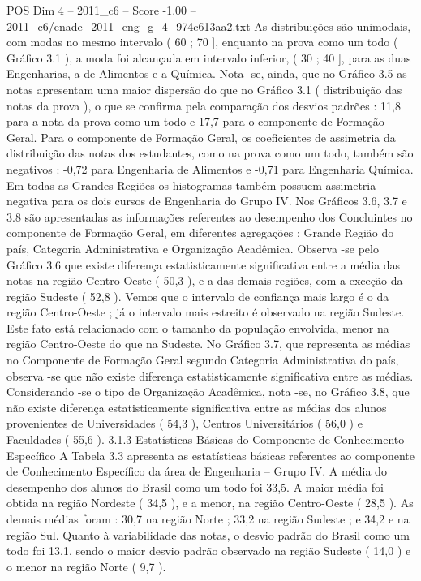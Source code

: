 \begin{textsample}{POS Dim 4 – 2011\_c6 – Score -1.00 – 2011\_c6/enade\_2011\_eng\_g\_4\_974c613aa2.txt}
As distribuições são unimodais, com modas no mesmo intervalo ( 60 ; 70 ], enquanto na prova como um todo ( Gráfico 3.1 ), a moda foi alcançada em intervalo inferior, ( 30 ; 40 ], para as duas Engenharias, a de Alimentos e a Química.
Nota -se, ainda, que no Gráfico 3.5 as notas apresentam uma maior dispersão do que no Gráfico 3.1 ( distribuição das notas da prova ), o que se confirma pela comparação dos desvios padrões : 11,8 para a nota da prova como um todo e 17,7 para o componente de Formação Geral.
Para o componente de Formação Geral, os coeficientes de assimetria da distribuição das notas dos estudantes, como na prova como um todo, também são negativos : -0,72 para Engenharia de Alimentos e -0,71 para Engenharia Química.
Em todas as Grandes Regiões os histogramas também possuem assimetria negativa para os dois cursos de Engenharia do Grupo IV.
Nos Gráficos 3.6, 3.7 e 3.8 são apresentadas as informações referentes ao desempenho dos Concluintes no componente de Formação Geral, em diferentes agregações : Grande Região do país, Categoria Administrativa e Organização Acadêmica.
Observa -se pelo Gráfico 3.6 que existe diferença estatisticamente significativa entre a média das notas na região Centro-Oeste ( 50,3 ), e a das demais regiões, com a exceção da região Sudeste ( 52,8 ).
Vemos que o intervalo de confiança mais largo é o da região Centro-Oeste ; já o intervalo mais estreito é observado na região Sudeste.
Este fato está relacionado com o tamanho da população envolvida, menor na região Centro-Oeste do que na Sudeste.
No Gráfico 3.7, que representa as médias no Componente de Formação Geral segundo Categoria Administrativa do país, observa -se que não existe diferença estatisticamente significativa entre as médias.
Considerando -se o tipo de Organização Acadêmica, nota -se, no Gráfico 3.8, que não existe diferença estatisticamente significativa entre as médias dos alunos provenientes de Universidades ( 54,3 ), Centros Universitários ( 56,0 ) e Faculdades ( 55,6 ). 3.1.3 Estatísticas Básicas do Componente de Conhecimento Específico A Tabela 3.3 apresenta as estatísticas básicas referentes ao componente de Conhecimento Específico da área de Engenharia – Grupo IV.
A média do desempenho dos alunos do Brasil como um todo foi 33,5.
A maior média foi obtida na região Nordeste ( 34,5 ), e a menor, na região Centro-Oeste ( 28,5 ).
As demais médias foram : 30,7 na região Norte ; 33,2 na região Sudeste ; e 34,2 e na região Sul.
Quanto à variabilidade das notas, o desvio padrão do Brasil como um todo foi 13,1, sendo o maior desvio padrão observado na região Sudeste ( 14,0 ) e o menor na região Norte ( 9,7 ).

\end{textsample}
